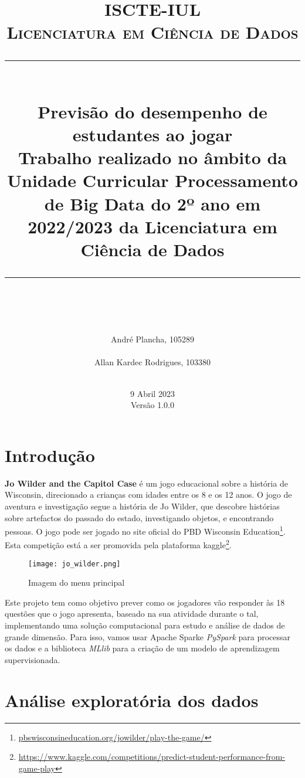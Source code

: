 \documentclass[justified, 11pt]{scrartcl}
\title{	
	\normalfont\normalsize
	\textsc{ISCTE-IUL \\ Licenciatura em Ciência de Dados}\\
	\vspace{20pt} 
	\rule{\linewidth}{0.5pt}\\
	\vspace{20pt}
	{\huge Previsão do desempenho de estudantes ao jogar}\\ 
  \vspace{16pt} 
  {\large Trabalho realizado no âmbito da Unidade Curricular Processamento de Big Data do 2º ano em 2022/2023 da Licenciatura em Ciência de Dados}\\
	\vspace{12pt}
	\rule{\linewidth}{2pt}\\
	\vspace{20pt} 
}
\author{
  André Plancha, 105289 \\
  \email{Andre\_Plancha@iscte-iul.pt}\\
  Allan Kardec Rodrigues, 103380 \\
  \email{aksrs@iscte-iul.pt} \\
  \vspace{30pt}
}
\date{9 Abril 2023 \\ Versão 1.0.0}
\begin{document}
  \thispagestyle{empty}
  \maketitle
  \pagebreak
  \section{Introdução}
  \textbf{Jo Wilder and the Capitol Case} é um jogo educacional sobre a história de Wisconsin, direcionado a crianças com idades entre os 8 e os 12 anos. O jogo de aventura e investigação segue a história de Jo Wilder, que descobre histórias sobre artefactos do passado do estado, investigando objetos, e encontrando pessoas. O jogo pode ser jogado no site oficial do PBD Wisconsin Education\footnote{\url{pbswisconsineducation.org/jowilder/play-the-game/}}. Esta competição está a ser promovida pela plataforma kaggle\footnote{\url{https://www.kaggle.com/competitions/predict-student-performance-from-game-play}}.

  \begin{figure}[h]
    \centering
    \texttt{[image: jo\_wilder.png]}
    \caption{Imagem do menu principal}
    \label{fig:jo_wilder}
  \end{figure}

  Este projeto tem como objetivo prever como os jogadores vão responder às 18 questões que o jogo apresenta, baseado na sua atividade durante o tal, implementando uma solução computacional para estudo e análise de dados de grande dimensão. Para isso, vamos usar Apache Spark\texttrademark e \textit{PySpark} para processar os dados e a biblioteca \textit{MLlib} para a criação de um modelo de aprendizagem supervisionada.

  \section{Análise exploratória dos dados}
  
\end{document}
